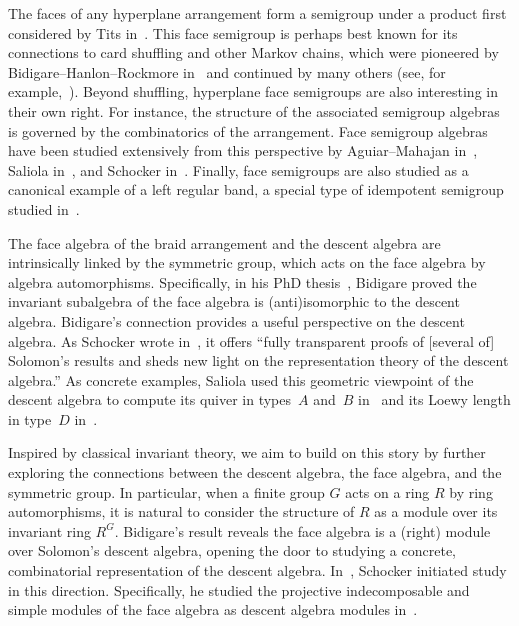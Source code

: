 \documentclass[ALCO, Unicode]{cedram}
\begin{document}
The faces of any hyperplane arrangement form a semigroup under a product first considered by Tits in~\cite{TITS1976265}. This face semigroup is perhaps best known for its connections to card shuffling and other Markov chains, which were pioneered by Bidigare--Hanlon--Rockmore in~\cite{BHR} and continued by many others (see, for example,~\cite{browndiac, DIEKER2018427, lafreniere, reiner2014spectra, Uyemura-Reyes}). Beyond shuffling, hyperplane face semigroups are also interesting in their own right. For instance, the structure of the associated semigroup {algebras} is governed by the combinatorics of the arrangement. Face semigroup algebras have been studied extensively from this perspective by Aguiar--Mahajan in~\cite{Aguiar-Mahajan},  Saliola in~\cite{saliolaloewytypeD, saliolaquiverdescalgebra, saliolafacealgebra}, and Schocker in~\cite{Schocker}. Finally, face semigroups are also studied as a canonical example of a left regular band, a special type of idempotent semigroup studied in~\cite{aguiar2006coxeter, BrownonLRBs, margolis2015combinatorial, MSS,saliolaquiverlrb,  SteinbergRepMonoidsBook}.

The face algebra of the braid arrangement and the descent algebra are intrinsically linked by the symmetric group, which acts on the face algebra by algebra automorphisms. Specifically, in his PhD thesis~\cite{Bidigare}, Bidigare proved the invariant subalgebra of the face algebra is (anti)isomorphic to the descent algebra. Bidigare's connection provides a useful perspective on the descent algebra. As Schocker wrote in~\cite{SchockerSurvey}, it offers ``fully transparent proofs of [several of] Solomon's results and sheds new light on the representation theory of the descent algebra.'' As concrete examples, Saliola used this geometric viewpoint of the descent algebra to compute its quiver in types~$A$ and~$B$ in~\cite{saliolaquiverdescalgebra} and its Loewy length in type~$D$ in~\cite{saliolaloewytypeD}. 

Inspired by classical invariant theory, we aim to build on this story by further exploring the connections between the descent algebra, the face algebra, and the symmetric group. In particular, when a finite group $G$ acts on a ring $R$ by ring automorphisms, it is natural to consider the structure of $R$ as a module over its invariant ring $R^G.$  Bidigare's result reveals the face algebra is a (right) module over Solomon's descent algebra, opening the door to studying a concrete, combinatorial representation of the descent algebra. In~\cite[\S 9.3]{Schocker}, Schocker initiated study in this direction. Specifically, he studied the projective indecomposable and simple modules of the face algebra as descent algebra modules in~\cite[Prop 9.4, Prop 9.6, Thm 9.7]{Schocker}. 
\end{document}
